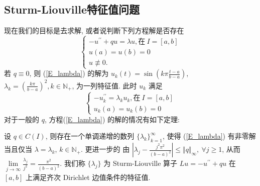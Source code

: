 \documentclass[11pt]{ctexart}[UTF8]
\begin{document}
\subsection{Sturm-Liouville特征值问题}
现在我们的目标是去求解, 或者说判断下列方程解是否存在
\begin{equation}\label{E_lambda}
    \begin{cases}
        -u^{\prime\prime} + q u = \lambda u, \text{在}\  I=[a,b] \\
        u(a) = u(b) = 0\\
        u \not\equiv 0.
    \end{cases}
\end{equation}
若 $q \equiv 0$, 则 (\ref{E_lambda}) 的解为 $u_{k}(t) = \sin\left( k\pi \frac{t-a}{b-a} \right)$, $\lambda_{k} = \left( \frac{k\pi}{b-a} \right)^2, k \in \mathbb{N}_{+}$, 为一列特征值.
此时 $u_{k}$ 满足
\begin{equation*}
    \begin{cases}
        -u_{k}^{\prime\prime} = \lambda_{k} u_{k}, \text{在}\  I=[a,b] \\
        u_{k}(a) = u_{k}(b) = 0
    \end{cases}
\end{equation*}
对于一般的 $q$, 方程(\ref{E_lambda}) 的解的情况有如下定理:
\begin{theorem}
    设 $q \in C(I)$, 则存在一个单调递增的数列 $\{\lambda_{k}\}_{k=1}^{\infty}$, 使得 (\ref{E_lambda}) 有非零解当且仅当 $\lambda = \lambda_{k}$, $k \in \mathbb{N}_{+}$. 更进一步的
    由 $\left| \lambda_{j}-\frac{j^2\pi^2}{(b-a)^2} \right| \leq \Vert q \Vert_{\infty},\ \forall j \geq 1$, 从而 $\lim\limits_{j \to \infty} \frac{\lambda_{j}}{j^2} = \frac{\pi^2}{(b-a)^2}$.
    我们称 $\{\lambda_{j}\}$ 为 Sturm-Liouville 算子 $Lu = -u^{\prime\prime} + q u$ 在 $[a,b]$ 上满足齐次 Dirichlet 边值条件的特征值.
\end{theorem}
\end{document}
